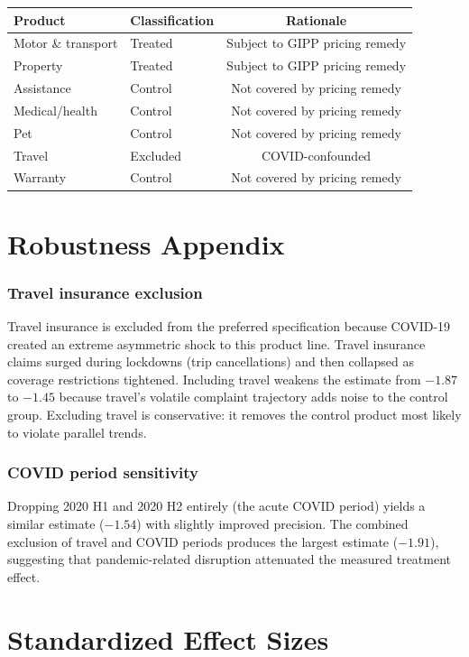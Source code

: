\documentclass[12pt]{article}
\begin{document}
\begin{table}[H]
\centering
\small
\begin{tabular}{llc}
\toprule
Product & Classification & Rationale \\
\midrule
Motor \& transport & Treated & Subject to GIPP pricing remedy \\
Property & Treated & Subject to GIPP pricing remedy \\
Assistance & Control & Not covered by pricing remedy \\
Medical/health & Control & Not covered by pricing remedy \\
Pet & Control & Not covered by pricing remedy \\
Travel & Excluded & COVID-confounded \\
Warranty & Control & Not covered by pricing remedy \\
\bottomrule
\end{tabular}
\end{table}


\section{Robustness Appendix}

\subsubsection*{Travel insurance exclusion} Travel insurance is excluded from the preferred specification because COVID-19 created an extreme asymmetric shock to this product line. Travel insurance claims surged during lockdowns (trip cancellations) and then collapsed as coverage restrictions tightened. Including travel weakens the estimate from $-1.87$ to $-1.45$ because travel's volatile complaint trajectory adds noise to the control group. Excluding travel is conservative: it removes the control product most likely to violate parallel trends.

\subsubsection*{COVID period sensitivity} Dropping 2020 H1 and 2020 H2 entirely (the acute COVID period) yields a similar estimate ($-1.54$) with slightly improved precision. The combined exclusion of travel and COVID periods produces the largest estimate ($-1.91$), suggesting that pandemic-related disruption attenuated the measured treatment effect.


\section{Standardized Effect Sizes}
\label{sec:sde}


\end{document}
